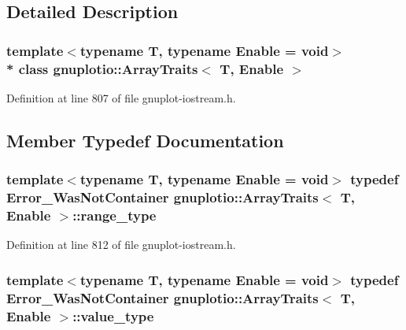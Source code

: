 \subsection{Detailed Description}
\subsubsection*{template$<$typename T, typename Enable = void$>$\\*
class gnuplotio\+::\+Array\+Traits$<$ T, Enable $>$}



Definition at line 807 of file gnuplot-\/iostream.\+h.



\subsection{Member Typedef Documentation}
\subsubsection[{\texorpdfstring{range\+\_\+type}{range_type}}]{\setlength{\rightskip}{0pt plus 5cm}template$<$typename T, typename Enable = void$>$ typedef {\bf Error\+\_\+\+Was\+Not\+Container} {\bf gnuplotio\+::\+Array\+Traits}$<$ T, Enable $>$\+::{\bf range\+\_\+type}}\hypertarget{classgnuplotio_1_1_array_traits_ae53464a5175c03deec403392b8dcb3c5}{}\label{classgnuplotio_1_1_array_traits_ae53464a5175c03deec403392b8dcb3c5}


Definition at line 812 of file gnuplot-\/iostream.\+h.

\subsubsection[{\texorpdfstring{value\+\_\+type}{value_type}}]{\setlength{\rightskip}{0pt plus 5cm}template$<$typename T, typename Enable = void$>$ typedef {\bf Error\+\_\+\+Was\+Not\+Container} {\bf gnuplotio\+::\+Array\+Traits}$<$ T, Enable $>$\+::{\bf value\+\_\+type}}\hypertarget{classgnuplotio_1_1_array_traits_a3bcae12a7bf42af90f4946acc66f27e0}{}\label{classgnuplotio_1_1_array_traits_a3bcae12a7bf42af90f4946acc66f27e0}


